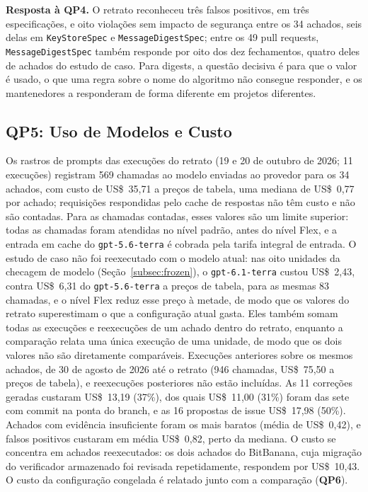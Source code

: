 \documentclass[conference]{IEEEtran}
\newcommand{\researchq}[1]{\textbf{QP#1}}
\begin{document}
\textbf{Resposta à \researchq{4}.} O retrato reconheceu três falsos
positivos, em três especificações, e oito violações sem impacto de
segurança entre os 34 achados, seis delas em \texttt{KeyStoreSpec} e
\texttt{MessageDigestSpec}; entre os 49 pull requests,
\texttt{MessageDigestSpec} também responde por oito dos dez fechamentos, quatro
deles de achados do estudo de caso. Para digests, a
questão decisiva é para que o valor é usado, o que uma regra sobre o
nome do algoritmo não consegue responder, e os mantenedores a responderam de forma diferente em
projetos diferentes.

\subsection{\researchq{5}: Uso de Modelos e Custo}

Os rastros de prompts das execuções do retrato (19 e 20 de outubro de 2026;
11 execuções) registram 569 chamadas ao modelo enviadas ao provedor para os 34 achados,
com custo de US\$~35,71 a preços de tabela, uma mediana de US\$~0,77 por
achado; requisições
respondidas pelo cache de respostas não têm custo e não são contadas. Para as
chamadas contadas, esses valores são um limite superior: todas as chamadas foram atendidas no nível padrão,
antes do nível Flex, e a entrada em cache do \texttt{gpt-5.6-terra} é cobrada pela
tarifa integral de entrada. O estudo de caso não foi reexecutado com o modelo
atual: nas oito unidades da checagem de modelo (Seção~\ref{subsec:frozen}), o
\texttt{gpt-6.1-terra} custou US\$~2,43, contra US\$~6,31 do
\texttt{gpt-5.6-terra} a preços de tabela, para as mesmas 83 chamadas, e o nível
Flex reduz esse preço à metade, de modo que os valores do retrato superestimam o
que a configuração atual gasta. Eles também somam todas as execuções e
reexecuções de um achado dentro do retrato, enquanto a comparação relata uma
única execução de uma unidade, de modo que os dois valores não são diretamente
comparáveis. Execuções anteriores sobre os mesmos achados, de 30 de agosto de
2026 até o retrato (946 chamadas, US\$~75,50 a preços de tabela), e
reexecuções posteriores não estão incluídas. As 11 correções geradas custaram
US\$~13,19 (37\%), dos quais US\$~11,00 (31\%) foram das sete com commit na
ponta do branch, e as 16 propostas de issue US\$~17,98 (50\%). Achados com
evidência insuficiente foram os mais baratos (média de US\$~0,42), e falsos
positivos custaram em média US\$~0,82, perto da mediana. O custo se concentra
em achados reexecutados: os dois achados do BitBanana, cuja migração do
verificador armazenado foi revisada repetidamente, respondem por US\$~10,43. O custo da configuração
congelada é relatado junto com a comparação (\researchq{6}).
\end{document}
